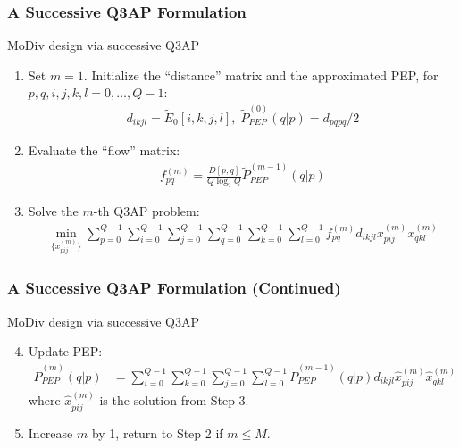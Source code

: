 \documentclass{beamer}
\begin{document}
\begin{frame}
  \frametitle{A Successive Q3AP Formulation}
  \begin{block}{MoDiv design via successive Q3AP}
    \begin{enumerate}[<+->]
      \item Set $m = 1$. Initialize the ``distance'' matrix and the approximated
      PEP, for $p, q, i, j, k, l=0,\ldots,Q-1$:
      \begin{align*}
        d_{ikjl} = \tilde{E}_0[i,k,j,l],\; \tilde{P}_{PEP}^{(0)}(q|p) =
        d_{pqpq}/2
      \end{align*}
      \item Evaluate the ``flow'' matrix:
      \begin{align*}
        f_{pq}^{(m)} = \frac{D[p,q]}{Q\log_2Q}\tilde{P}_{PEP}^{(m-1)}(q|p)
      \end{align*}
      \item Solve the $m$-th Q3AP problem:
      \begin{align*}
        \min_{\{x_{pij}^{(m)}\}}
        \sum_{p=0}^{Q-1}\sum_{i=0}^{Q-1}\sum_{j=0}^{Q-1}
        \sum_{q=0}^{Q-1}\sum_{k=0}^{Q-1}\sum_{l=0}^{Q-1}
        f_{pq}^{(m)}d_{ikjl}x_{pij}^{(m)}x_{qkl}^{(m)}
      \end{align*}
    \end{enumerate}
  \end{block}
\end{frame}

\begin{frame}
  \frametitle{A Successive Q3AP Formulation (Continued)}
  \begin{block}{MoDiv design via successive Q3AP}
    \begin{enumerate}[<+->]
      \setcounter{enumi}{3}
      \item Update PEP:
      \begin{align*}
        \tilde{P}_{PEP}^{(m)}(q|p) & = \sum_{i=0}^{Q-1} \sum_{k=0}^{Q-1}
        \sum_{j=0}^{Q-1} \sum_{l=0}^{Q-1}\tilde{P}_{PEP}^{(m
        - 1)}(q|p)d_{ikjl}\hat{x}_{pij}^{(m)}\hat{x}_{qkl}^{(m)}
      \end{align*}
      where $\hat{x}_{pij}^{(m)}$ is the solution from Step 3.
      \item Increase $m$ by 1, return to Step 2 if $m \leq M$.
    \end{enumerate}
  \end{block}
  \vfill
\end{frame}
\end{document}
